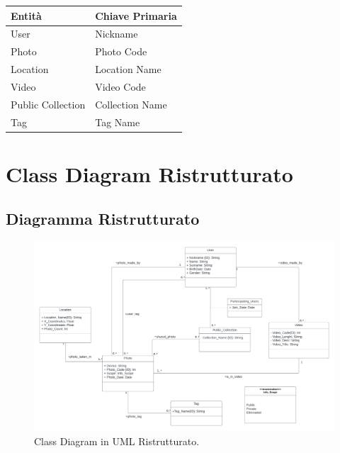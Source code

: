         \begin{tabular}{|p{6cm}|p{5cm}|}
        \hline
        \textbf{Entità} & \textbf{Chiave Primaria}\\
        \hline
        User & Nickname \\
        \hline 
        Photo & Photo Code \\
        \hline 
        Location & Location Name \\
        \hline 
        Video & Video Code \\
        \hline 
        Public Collection & Collection Name \\
        \hline 
        Tag & Tag Name \\
        \hline 
        \end{tabular}

        \vspace{2em}
        
    \section{Class Diagram Ristrutturato}
        \subsection{Diagramma Ristrutturato}
        \begin{figure}[h]
            \centering
            \includegraphics[width=1\linewidth]{Immagini/plogico2.png}
            \caption{Class Diagram in UML Ristrutturato.}
            \label{fig:galaxy}
        \end{figure}


